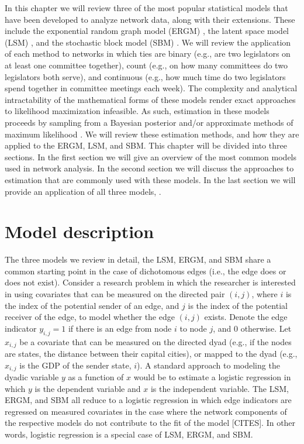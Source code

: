 \documentclass[fleqn,12pt]{wlscirep}
\begin{document}
In this chapter we will review three of the most popular statistical models that have been developed to analyze network data, along with their extensions. These include the exponential random graph model (ERGM) \citep{cranmer2011inferential}, the latent space model (LSM) \citep{dorff2016latent},  and the stochastic block model (SBM) \citep{latouche2011overlapping}. We will review the application of each method to networks in which ties are binary (e.g., are two legislators on at least one committee together), count (e.g., on how many committees do two legislators both serve), and continuous (e.g., how much time do two legislators spend together in committee meetings each week). The complexity and analytical intractability of the mathematical forms of these models render exact approaches to likelihood maximization infeasible. As such, estimation in these models proceeds by sampling from a Bayesian posterior and/or approximate methods of maximum likelihood \citep{raftery2012fast,van2009framework,nowicki2001estimation}. We will review these estimation methods, and how they are applied to the ERGM, LSM, and SBM.  This chapter will be divided into three sections. In the first section we will give an overview of the most common models used in network analysis. In the second section we will discuss the approaches to estimation that are commonly used with these models. In the last section we will provide an application of all three models, .

\section{Model description}

The three models we review in detail, the LSM, ERGM, and SBM share a common starting point in the case of dichotomous edges (i.e., the edge does or does not exist). Consider a research problem in which the researcher is interested in using covariates that can be measured on the directed pair $(i,j)$, where $i$ is the index of the potential sender of an edge, and $j$ is the index of the potential receiver of the edge, to model whether the edge $(i,j)$ exists. Denote the edge indicator $y_{i,j} = 1$  if there is an edge from node $i$ to node $j$, and 0 otherwise. Let $x_{i,j}$ be a covariate that can be measured on the directed dyad (e.g., if the nodes are states, the distance between their capital cities), or mapped to the dyad (e.g., $x_{i,j}$ is the GDP of the sender state, $i$). A standard approach to modeling the dyadic variable $y$ as a function of $x$ would be to estimate a logistic regression in which $y$ is the dependent variable and $x$ is the independent variable. The LSM, ERGM, and SBM all reduce to a logistic regression in which edge indicators are regressed on measured covariates in the case where the network components of the respective models do not contribute to the fit of the model [CITES]. In other words, logistic regression is a special case of LSM, ERGM, and SBM. 
\end{document}
